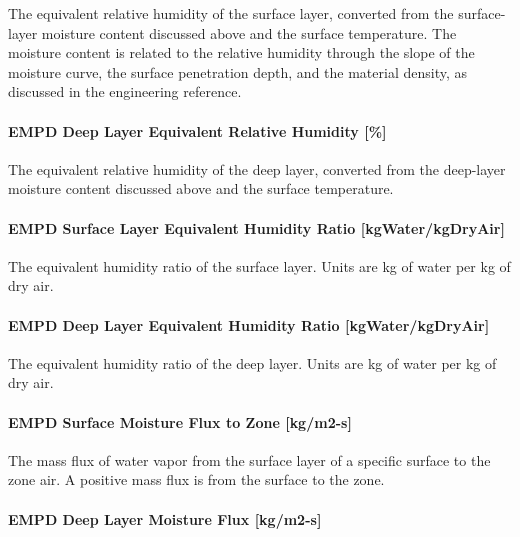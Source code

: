 The equivalent relative humidity of the surface layer, converted from the surface-layer moisture content discussed above and the surface temperature. The moisture content is related to the relative humidity through the slope of the moisture curve, the surface penetration depth, and the material density, as discussed in the engineering reference.

\paragraph{EMPD Deep Layer Equivalent Relative Humidity {[}\%{]}}\label{empd-deep-layer-equivalent-relative-humidity}

The equivalent relative humidity of the deep layer, converted from the deep-layer moisture content discussed above and the surface temperature.

\paragraph{EMPD Surface Layer Equivalent Humidity Ratio	{[}kgWater/kgDryAir{]}}\label{empd-surface-layer-equivalent-humidity-ratio-kgwaterkgdryair}

The equivalent humidity ratio of the surface layer. Units are kg of water per kg of dry air.

\paragraph{EMPD Deep Layer Equivalent Humidity Ratio {[}kgWater/kgDryAir{]}}\label{empd-deep-layer-equivalent-humidity-ratio-kgwaterkgdryair}

The equivalent humidity ratio of the deep layer. Units are kg of water per kg of dry air.

\paragraph{EMPD Surface Moisture Flux to Zone {[}kg/m2-s{]}}\label{empd-surface-moisture-flux-to-zone-kgm2-s}

The mass flux of water vapor from the surface layer of a specific surface to the zone air. A positive mass flux is from the surface to the zone.

\paragraph{EMPD Deep Layer Moisture Flux {[}kg/m2-s{]}}\label{empd-deep-layer-moisture-flux-kgm2-s}

